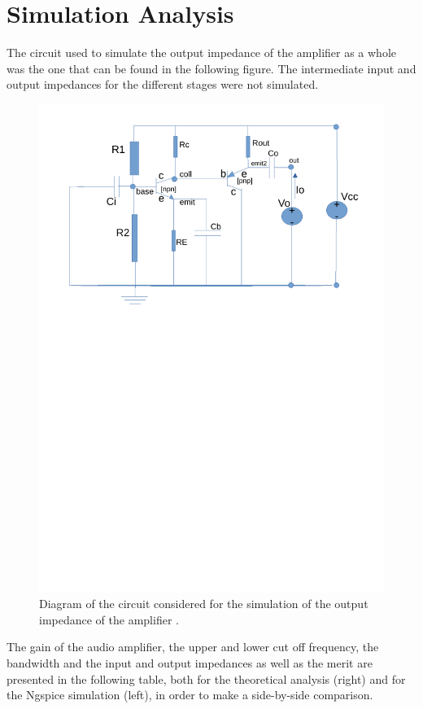 \section{Simulation Analysis}
\label{sec:simulation}

The circuit used to simulate the output impedance of the amplifier as a whole was the one that can be found in the following figure. The intermediate input and output impedances for the different stages were not simulated.

\begin{figure}[H] \centering
\includegraphics[width=0.95\linewidth]{diagram_t4_zout.pdf}
\vspace{-10cm}
\caption{Diagram of the circuit considered for the simulation of the output impedance of the amplifier .}
\label{fig:diagram_t4_zout}
\end{figure}


The gain of the audio amplifier, the upper and lower cut off frequency, the bandwidth and the input and output impedances as well as the merit are presented in the following table, both for the theoretical analysis (right) and for the Ngspice simulation (left), in order to make a side-by-side comparison.


